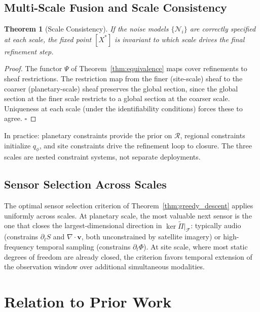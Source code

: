 \documentclass[11pt, oneside]{article}
\newtheorem{theorem}{Theorem}[section]
\newcommand{\Ftil}{\widetilde{\Pi}}
\begin{document}
\subsection{Multi-Scale Fusion and Scale Consistency}

\begin{theorem}[Scale Consistency]
\label{thm:scale}
If the noise models $\{\mathcal{N}_i\}$ are correctly specified at each scale, the fixed
point $[X^*]$ is invariant to which scale drives the final refinement step.
\end{theorem}
\begin{proof}
The functor $\Psi$ of Theorem~\ref{thm:equivalence} maps cover refinements to sheaf
restrictions. The restriction map from the finer (site-scale) sheaf to the coarser
(planetary-scale) sheaf preserves the global section, since the global section at the
finer scale restricts to a global section at the coarser scale. Uniqueness at each scale
(under the identifiability conditions) forces these to agree. $\square$
\end{proof}

In practice: planetary constraints provide the prior on $\mathcal{R}$, regional
constraints initialize $q_\phi$, and site constraints drive the refinement loop to
closure. The three scales are nested constraint systems, not separate deployments.

\subsection{Sensor Selection Across Scales}

The optimal sensor selection criterion of Theorem~\ref{thm:greedy_descent} applies
uniformly across scales. At planetary scale, the most valuable next sensor is the one
that closes the largest-dimensional direction in $\ker \Ftil|_{\mathcal{F}}$: typically
audio (constrains $\partial_t S$ and $\nabla\cdot\mathbf{v}$, both unconstrained by
satellite imagery) or high-frequency temporal sampling (constrains $\partial_t\Phi$).
At site scale, where most static degrees of freedom are already closed, the criterion
favors temporal extension of the observation window over additional simultaneous modalities.

\section{Relation to Prior Work}
\label{sec:related}
\end{document}
